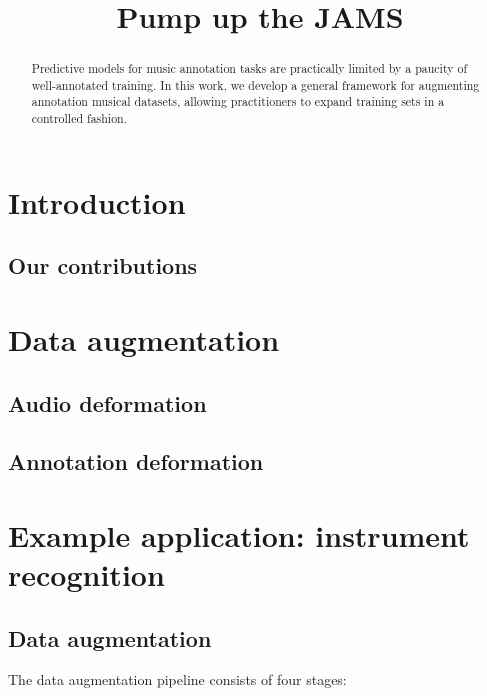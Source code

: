 \documentclass{article}
\title{Pump up the JAMS}
\begin{document}
%
\maketitle
%
\begin{abstract}
Predictive models for music annotation tasks are practically limited by a paucity of
well-annotated training.
In this work, we develop a general framework for augmenting annotation musical datasets,
allowing practitioners to expand training sets in a controlled fashion.
\end{abstract}
%
\section{Introduction}
\label{sec:introduction}

\cite{sturmkiki}

\subsection{Our contributions}

\section{Data augmentation}

\cite{mauch2013audio}

\subsection{Audio deformation}

\subsection{Annotation deformation}

\cite{humphreyjams}

\section{Example application: instrument recognition}

\cite{bittner2014medleydb}

\subsection{Data augmentation}

The data augmentation pipeline consists of four stages:
\end{document}
